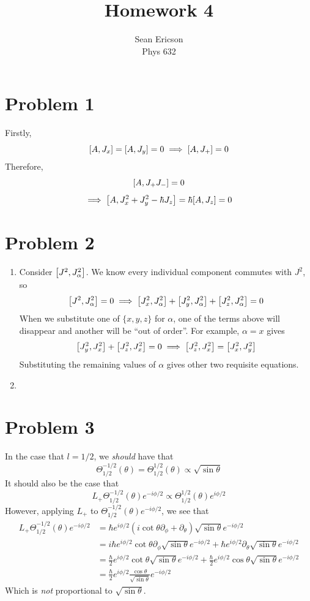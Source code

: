 \documentclass[12pt]{article}
\begin{document}
	
\title{Homework 4}
\author{Sean Ericson \\ Phys 632}
\maketitle

\section*{Problem 1}
Firstly,
\[ \comm{A}{J_x} = \comm{A}{J_y} = 0 \implies \comm{A}{J_+} = 0 \]
Therefore,
\[ \comm{A}{J_+J_-} = 0 \]
\[ \implies \comm{A}{J_x^2 + J_y^2 -\hbar J_z} = \hbar\comm{A}{J_z} = 0 \]

\section*{Problem 2}
\begin{enumerate}[label=(\alph*)]
    \item Consider $\comm{J^2}{J_\alpha^2}$. We know every individual component commutes with $J^2$, so
    \[ \comm{J^2}{J_\alpha^2} = 0 \implies \comm{J_x^2}{J_\alpha^2} + \comm{J_y^2}{J_\alpha^2} + \comm{J_z^2}{J_\alpha^2} = 0 \]
    When we substitute one of $\{x, y, z\}$ for $\alpha$, one of the terms above will disappear and another will be ``out of order''. For example, $\alpha = x$ gives
    \[ \comm{J_y^2}{J_x^2} + \comm{J_z^2}{J_x^2} = 0 \implies \comm{J_z^2}{J_x^2} = \comm{J_x^2}{J_y^2}\]
    Substituting the remaining values of $\alpha$ gives other two requisite equations.

    \item 
\end{enumerate}


\section*{Problem 3}
In the case that $l = 1/2$, we \textit{should} have that
\[ \Theta_{1/2}^{-1/2}(\theta) = \Theta_{1/2}^{1/2}(\theta) \propto \sqrt{\sin\theta} \]
It should also be the case that
\[ L_+\Theta_{1/2}^{-1/2}(\theta)e^{-i\phi/2} \propto \Theta_{1/2}^{1/2}(\theta)e^{i\phi/2} \]
However, applying $L_+$ to $\Theta_{1/2}^{-1/2}(\theta)e^{-i\phi/2}$, we see that
\begin{align*}
    L_+\Theta_{1/2}^{-1/2}(\theta)e^{-i\phi/2} & = \hbar e^{i\phi/2}\left(i\cot\theta\partial_\phi + \partial_\theta\right)\sqrt{\sin\theta}e^{-i\phi/2} \\
    & = i\hbar e^{i\phi/2}\cot\theta\partial_\phi\sqrt{\sin\theta}e^{-i\phi/2} + \hbar e^{i\phi/2}\partial_\theta\sqrt{\sin\theta}e^{-i\phi/2} \\
    & = \frac{\hbar}{2}e^{i\phi/2}\cot\theta\sqrt{\sin\theta}e^{-i\phi/2} + \frac{\hbar}{2}e^{i\phi/2}\cos\theta\sqrt{\sin\theta}e^{-i\phi/2} \\
    & = \frac{\hbar}{2}e^{i\phi/2}\frac{\cos\theta}{\sqrt{\sin\theta}}e^{-i\phi/2}
\end{align*}
Which is \textit{not} proportional to $\sqrt{\sin\theta}$.
\end{document}
